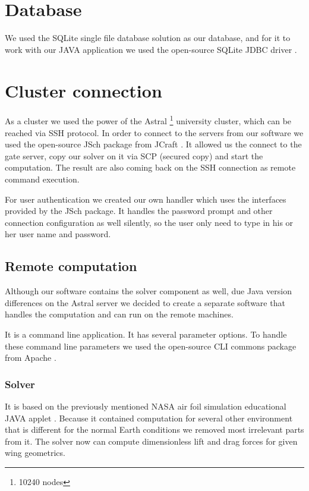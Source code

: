 \documentclass[10pt,a4paper]{report}
\begin{document}
\section{Database}
We used the SQLite single file database solution as our database, and for it to work with our JAVA application we used the open-source SQLite JDBC driver \cite{WWW:SQLite}.

\section{Cluster connection}
As a cluster we used the power of the Astral \footnote{10240 nodes} university cluster, which can be reached via SSH protocol. In order to connect to the servers from our software we used the open-source JSch package from JCraft \cite{WWW:JSCH}. It allowed us the connect to the gate server, copy our solver on it via SCP (secured copy) and start the computation. The result are also coming back on the SSH connection as remote command execution.

For user authentication we created our own handler which uses the interfaces provided by the JSch package. It handles the password prompt and other connection configuration as well silently, so the user only need to type in his or her user name and password.

\subsection{Remote computation}
Although our software contains the solver component as well, due Java version differences on the Astral server we decided to create a separate software that handles the computation and can run on the remote machines.

It is a command line application. It has several parameter options. To handle these command line parameters we used the open-source CLI commons package from Apache \cite{WWW:CLI}.

\subsubsection{Solver}
It is based on the previously mentioned NASA air foil simulation educational JAVA applet \cite{WWW:NASA}. Because it contained computation for several other environment that is different for the normal Earth conditions we removed most irrelevant parts from it. The solver now can compute dimensionless lift and drag forces for given wing geometrics.
\end{document}
